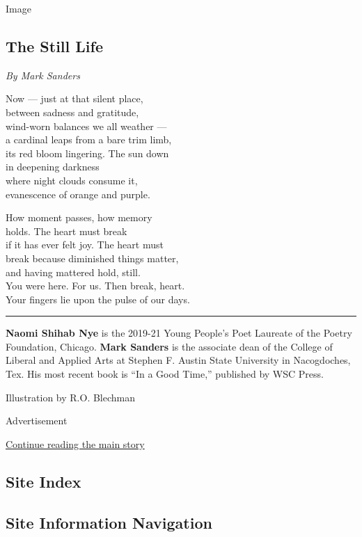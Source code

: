 Image

\hypertarget{the-still-life}{%
\subsection{The Still Life}\label{the-still-life}}

\emph{By Mark Sanders}

Now --- just at that silent place,\\
between sadness and gratitude,\\
wind-worn balances we all weather ---\\
a cardinal leaps from a bare trim limb,\\
its red bloom lingering. The sun down\\
in deepening darkness\\
where night clouds consume it,\\
evanescence of orange and purple.

How moment passes, how memory\\
holds. The heart must break\\
if it has ever felt joy. The heart must\\
break because diminished things matter,\\
and having mattered hold, still.\\
You were here. For us. Then break, heart.\\
Your fingers lie upon the pulse of our days.

\begin{center}\rule{0.5\linewidth}{\linethickness}\end{center}

\textbf{Naomi Shihab Nye} is the 2019-21 Young People's Poet Laureate of
the Poetry Foundation, Chicago. \textbf{Mark Sanders} is the associate
dean of the College of Liberal and Applied Arts at Stephen F. Austin
State University in Nacogdoches, Tex. His most recent book is ``In a
Good Time,'' published by WSC Press.

Illustration by R.O. Blechman

Advertisement

\protect\hyperlink{after-bottom}{Continue reading the main story}

\hypertarget{site-index}{%
\subsection{Site Index}\label{site-index}}

\hypertarget{site-information-navigation}{%
\subsection{Site Information
Navigation}\label{site-information-navigation}}

